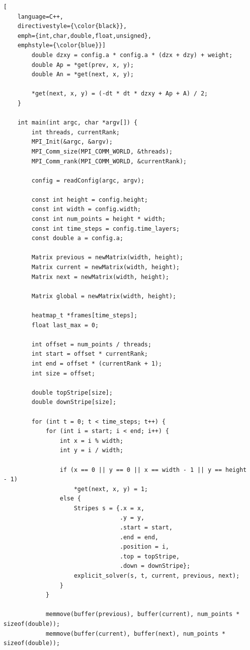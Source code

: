 \begin{lstlisting}[
    language=C++,
    directivestyle={\color{black}}, 
    emph={int,char,double,float,unsigned}, 
    emphstyle={\color{blue}}]
        double dzxy = config.a * config.a * (dzx + dzy) + weight;
        double Ap = *get(prev, x, y);
        double An = *get(next, x, y);
    
        *get(next, x, y) = (-dt * dt * dzxy + Ap + A) / 2;
    }
    
    int main(int argc, char *argv[]) {
        int threads, currentRank;
        MPI_Init(&argc, &argv);
        MPI_Comm_size(MPI_COMM_WORLD, &threads);
        MPI_Comm_rank(MPI_COMM_WORLD, &currentRank);
    
        config = readConfig(argc, argv);
    
        const int height = config.height;
        const int width = config.width;
        const int num_points = height * width;
        const int time_steps = config.time_layers;
        const double a = config.a;
    
        Matrix previous = newMatrix(width, height);
        Matrix current = newMatrix(width, height);
        Matrix next = newMatrix(width, height);
    
        Matrix global = newMatrix(width, height);
    
        heatmap_t *frames[time_steps];
        float last_max = 0;
    
        int offset = num_points / threads;
        int start = offset * currentRank;
        int end = offset * (currentRank + 1);
        int size = offset;
    
        double topStripe[size];
        double downStripe[size];
    
        for (int t = 0; t < time_steps; t++) {
            for (int i = start; i < end; i++) {
                int x = i % width;
                int y = i / width;
    
                if (x == 0 || y == 0 || x == width - 1 || y == height - 1)
                    *get(next, x, y) = 1;
                else {
                    Stripes s = {.x = x,
                                 .y = y,
                                 .start = start,
                                 .end = end,
                                 .position = i,
                                 .top = topStripe,
                                 .down = downStripe};
                    explicit_solver(s, t, current, previous, next);
                }
            }
    
            memmove(buffer(previous), buffer(current), num_points * sizeof(double));
            memmove(buffer(current), buffer(next), num_points * sizeof(double));
    

\end{lstlisting}
